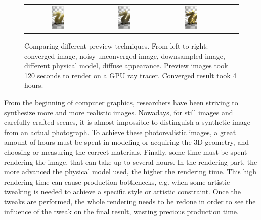 \begin{figure}
\begin{tabular}{@{}c@{}c@{}c@{}c@{}c@{}}
\includegraphics[width=0.2\textwidth]{figures/thesis_pt_unconverged2}& 	 	 \includegraphics[width=0.2\textwidth]{figures/thesis_pt_sd}& 	 	 \includegraphics[width=0.2\textwidth]{figures/thesis_pt_lambertian} \\
\end{tabular}
\caption{Comparing different preview techniques. From left to right: converged image, noisy unconverged image, downsampled image, different physical model, diffuse appearance. Preview images took 120 seconds to render on a GPU ray tracer. Converged result took 4 hours.} 
\label{fig:comparison_convergence}
\end{figure}

From the beginning of computer graphics, researchers have been striving to synthesize more and more realistic images. Nowadays, for still images and carefully crafted scenes, it is almost impossible to distinguish a synthetic image from an actual photograph. To achieve these photorealistic images, a great amount of hours must be spent in modeling or acquiring the 3D geometry, and choosing or measuring the correct materials. Finally, some time must be spent rendering the image, that can take up to several hours. In the rendering part, the more advanced the physical model used, the higher the rendering time. This high rendering time can cause production bottlenecks, e.g. when some artistic tweaking is needed to achieve a specific style or artistic constraint. Once the tweaks are performed, the whole rendering needs to be redone in order to see the influence of the tweak on the final result, wasting precious production time. 

